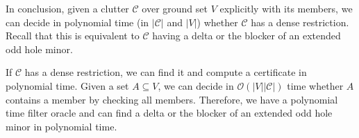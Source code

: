 \documentclass[a4paper, 12pt]{scrbook}
\theoremstyle{definition}
\begin{document}
   In conclusion, given a clutter $\mathcal{C}$ over ground set $V$ explicitly with its members, we can decide in polynomial time (in $|\mathcal{C}|$ and $|V|$) whether $\mathcal{C}$ has a dense restriction. Recall that this is equivalent to $\mathcal{C}$ having a delta or the blocker of an extended odd hole minor.

   If $\mathcal{C}$ has a dense restriction, we can find it and compute a certificate in polynomial time.
   Given a set $A \subseteq V$, we can decide in $\mathcal{O}(|V||\mathcal{C}|)$ time whether $A$ contains a member by checking all members. Therefore, we have a polynomial time filter oracle and can find a delta or the blocker of an extended odd hole minor in polynomial time.

   \printbibliography[title={References}]
\end{document}
